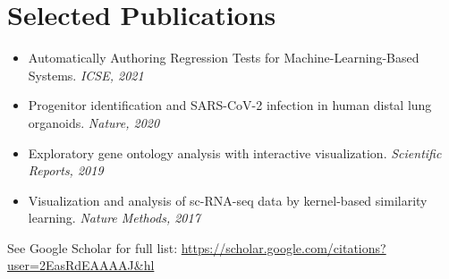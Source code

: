 \documentclass[letterpaper,11pt]{article}
\makeatletter
\newcommand{\resumeItem}[2]{
  \item\small{
    \textbf{#1}{: #2 \vspace{-2pt}}
  }
}
\newcommand{\resumeSubheading}[4]{
  \vspace{-1pt}\item
    \begin{tabular*}{0.97\textwidth}[t]{l@{\extracolsep{\fill}}r}
      \textbf{#1} & #2 \\
      \textit{\small#3} & \textit{\small #4} \\
    \end{tabular*}\vspace{-5pt}
}
\newcommand{\resumeSubHeadingListEnd}{\end{itemize}}
\newcommand{\resumeItemListStart}{\begin{itemize}}
\newcommand{\resumeItemListEnd}{\end{itemize}\vspace{-5pt}}
\makeatother
\begin{document}





\section{Selected Publications}
\vspace{0.5em}
  \begin{itemize}[leftmargin=*, topsep=4pt, parsep=2pt, itemsep=1pt]
    \item Automatically Authoring Regression Tests for Machine-Learning-Based Systems. \textit{ICSE, 2021}
    \item Progenitor identification and SARS-CoV-2 infection in human distal lung organoids. \textit{Nature, 2020}
    \item Exploratory gene ontology analysis with interactive visualization. \textit{Scientific Reports, 2019}
    \item Visualization and analysis of sc-RNA-seq data by kernel-based similarity learning. \textit{Nature Methods, 2017}
  \end{itemize}

See Google Scholar for full list: \url{https://scholar.google.com/citations?user=2EasRdEAAAAJ&hl}
\end{document}
